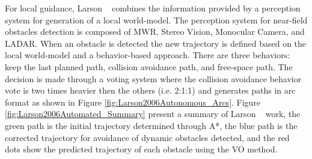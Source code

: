     For local guidance, Larson \etal~\cite{Larson2006Autonomous} combines the information provided by a perception system for generation of a local world-model. The perception system for near-field obstacles detection is composed of \ac{MWR}, Stereo Vision, Monocular Camera, and \ac{LADAR}. When an obstacle is detected the new trajectory is defined based on the local world-model and a behavior-based approach. There are three behaviors: keep the last planned path, collision avoidance path, and free-space path. The decision is made through a voting system where the collision avoidance behavior vote is two times heavier then the others (i.e. 2:1:1) and generates paths in arc format as shown in Figure \ref{fig:Larson2006Autonomous_Arcs}. Figure \ref{fig:Larson2006Automated_Summary} present a summary of Larson \etal~ work, the green path is the initial trajectory determined through A*, the blue path is the corrected trajectory for avoidance of dynamic obstacles detected, and the red dots show the predicted trajectory of each obstacle using the \ac{VO} method.
    
